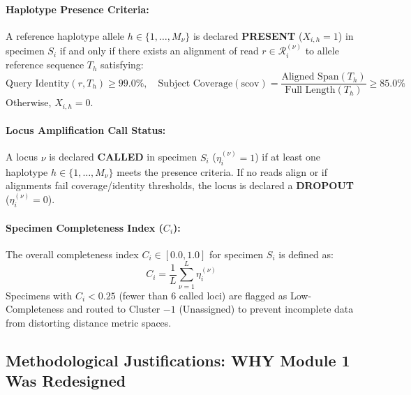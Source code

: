 \documentclass[11pt,a4paper]{article}
\begin{document}
\paragraph{Haplotype Presence Criteria:} A reference haplotype allele $h \in \{1, \dots, M_\nu\}$ is declared \textbf{PRESENT} ($X_{i, h} = 1$) in specimen $S_i$ if and only if there exists an alignment of read $r \in \mathcal{R}_{i}^{(\nu)}$ to allele reference sequence $T_h$ satisfying:
\begin{equation}
\text{Query Identity}(r, T_h) \ge 99.0\%, \quad \text{Subject Coverage}(\text{scov}) = \frac{\text{Aligned Span}(T_h)}{\text{Full Length}(T_h)} \ge 85.0\%
\end{equation}
Otherwise, $X_{i, h} = 0$.

\paragraph{Locus Amplification Call Status:} A locus $\nu$ is declared \textbf{CALLED} in specimen $S_i$ ($\eta_{i}^{(\nu)} = 1$) if at least one haplotype $h \in \{1, \dots, M_\nu\}$ meets the presence criteria. If no reads align or if alignments fail coverage/identity thresholds, the locus is declared a \textbf{DROPOUT} ($\eta_{i}^{(\nu)} = 0$).

\paragraph{Specimen Completeness Index ($C_i$):} The overall completeness index $C_i \in [0.0, 1.0]$ for specimen $S_i$ is defined as:
\begin{equation}
C_i = \frac{1}{L} \sum_{\nu=1}^L \eta_{i}^{(\nu)}
\end{equation}
Specimens with $C_i < 0.25$ (fewer than 6 called loci) are flagged as Low-Completeness and routed to Cluster $-1$ (Unassigned) to prevent incomplete data from distorting distance metric spaces.

\subsection{Methodological Justifications: WHY Module 1 Was Redesigned}
\end{document}
